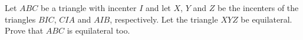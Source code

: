 Let $ABC$ be a triangle with incenter $I$ and let $X$,  $Y$ and $Z$ be the incenters of the triangles $BIC$,  $CIA$ and $AIB$,  respectively. Let the triangle $XYZ$ be equilateral. Prove that $ABC$ is equilateral too.